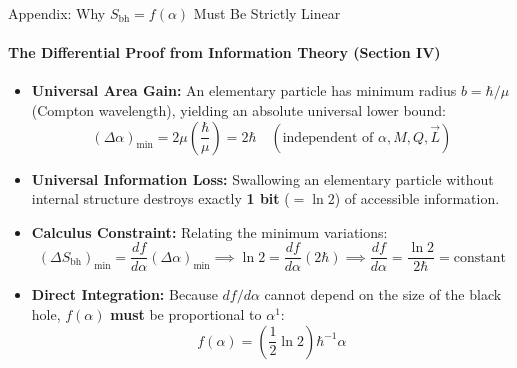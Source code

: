 \documentclass[aspectratio=169]{beamer}
\begin{document}
\begin{frame}{Appendix: Why $S_{\text{bh}} = f(\alpha)$ Must Be Strictly Linear}
\framesubtitle{The Differential Proof from Information Theory (Section IV)}
\begin{itemize}
  \item \textbf{Universal Area Gain:} An elementary particle has minimum radius $b = \hbar/\mu$ (Compton wavelength), yielding an absolute universal lower bound:
  \[
    (\Delta\alpha)_{\min} = 2\mu\left(\frac{\hbar}{\mu}\right) = 2\hbar \quad (\text{independent of } \alpha, M, Q, \vec{L})
  \]
  \item \textbf{Universal Information Loss:} Swallowing an elementary particle without internal structure destroys exactly \textbf{1 bit} ($=\ln 2$) of accessible information.
  \item \textbf{Calculus Constraint:} Relating the minimum variations:
  \[
    (\Delta S_{\text{bh}})_{\min} = \frac{df}{d\alpha}(\Delta\alpha)_{\min} \implies \ln 2 = \frac{df}{d\alpha} (2\hbar) \implies \boxed{\frac{df}{d\alpha} = \frac{\ln 2}{2\hbar} = \text{constant}}
  \]
  \item \textbf{Direct Integration:} Because $df/d\alpha$ cannot depend on the size of the black hole, $f(\alpha)$ \textbf{must} be proportional to $\alpha^1$:
  \[
    f(\alpha) = \left(\frac{1}{2}\ln 2\right)\hbar^{-1}\alpha
  \]
\end{itemize}
\end{frame}
\end{document}

